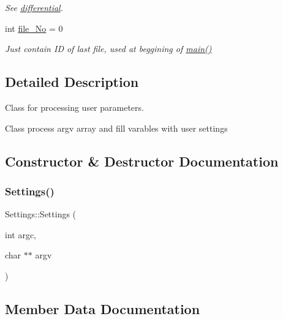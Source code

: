 \begin{DoxyCompactItemize}
\begin{DoxyCompactList}\small\item\em See \hyperlink{class_settings_a107556b8673e33e63d1310a73ed4aee7}{differential}. \end{DoxyCompactList}\item 
int \hyperlink{class_settings_abf56e843b1b674afe39d285d0ff5778f}{file\+\_\+\+No} = 0
\begin{DoxyCompactList}\small\item\em Just contain ID of last file, used at beggining of \hyperlink{_get_mic_8cpp_a3c04138a5bfe5d72780bb7e82a18e627}{main()} \end{DoxyCompactList}\end{DoxyCompactItemize}


\subsection{Detailed Description}
Class for processing user parameters. 

Class process argv array and fill varables with user settings 

\subsection{Constructor \& Destructor Documentation}
\mbox{\label{class_settings_a1dc49e08c9e740e0ccab6fa2f54537bd}} 
\subsubsection{\texorpdfstring{Settings()}{Settings()}}
{\footnotesize\ttfamily Settings\+::\+Settings (\begin{DoxyParamCaption}\item[{int}]{argc,  }\item[{char $\ast$$\ast$}]{argv }\end{DoxyParamCaption})}



\subsection{Member Data Documentation}
\mbox{\label{class_settings_a139c6c8d809e18fec0b3aae2b6286baa}} 

